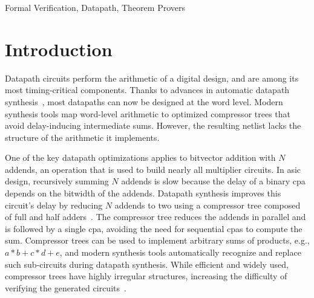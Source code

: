 \documentclass[conference]{IEEEtran}
\theoremstyle{plain}
\theoremstyle{definition}
\newcommand{\PerformanceSlowdownGeomean}{\ensuremath{Y \times}}
\begin{document}
\begin{abstract}

\end{abstract}

\begin{IEEEkeywords}
Formal Verification, Datapath, Theorem Provers
\end{IEEEkeywords}

\section{Introduction}
Datapath circuits perform the arithmetic of a digital design,
and are among its most timing-critical components.
Thanks to advances in automatic
datapath
synthesis~\cite{Zimmermann2003OptimizedSum-of-products,Zimmermann2009DatapathDesign},
most datapaths can now be designed at the word level.  Modern synthesis tools
map word-level arithmetic to optimized compressor trees that avoid delay-inducing intermediate sums. 
However, the resulting netlist lacks the structure of the arithmetic it implements.

One of the key datapath optimizations applies to bitvector addition with $N$ addends, an operation that is used to build nearly all multiplier circuits. 
In \ac{asic} design, recursively summing $N$ addends is slow because the delay of a binary \ac{cpa} depends on the bitwidth of the addends. 
Datapath synthesis improves this circuit's delay by reducing $N$ addends to two using a compressor tree composed of full and half adders~\cite{wallace_tree, application_specific_arithmetic}.
The compressor tree reduces the addends in parallel and is followed by a single \ac{cpa}, avoiding the need for sequential \acp{cpa} to compute the sum.
Compressor trees can be used to implement arbitrary sums of products, e.g., $a*b+c*d+e$, and modern synthesis tools automatically recognize and replace such sub-circuits during datapath synthesis. 
While efficient and widely used, compressor trees have highly irregular structures, increasing the difficulty of verifying the generated circuits~\cite{mul_verif}.
\end{document}
